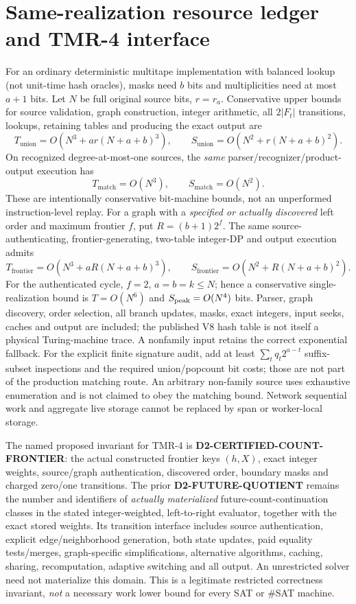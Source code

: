 \documentclass[11pt]{article}
\begin{document}
\section{Same-realization resource ledger and TMR-4 interface}
For an ordinary deterministic multitape implementation with balanced lookup (not unit-time hash oracles), masks need $b$ bits and multiplicities need at most $a+1$ bits. Let $N$ be full original source bits, $r=r_a$. Conservative upper bounds for source validation, graph construction, integer arithmetic, all $2|F_t|$ transitions, lookups, retaining tables and producing the exact output are
\[
T_{\mathrm{union}}=O(N^3+a r(N+a+b)^3),\qquad
S_{\mathrm{union}}=O(N^2+r(N+a+b)^2).
\]
On recognized degree-at-most-one sources, the \emph{same} parser/recognizer/product-output execution has
\[
T_{\mathrm{match}}=O(N^3),\qquad S_{\mathrm{match}}=O(N^2).
\]
These are intentionally conservative bit-machine bounds, not an unperformed instruction-level replay. For a graph with a \emph{specified or actually discovered} left order and maximum frontier $f$, put $R=(b+1)2^f$. The same source-authenticating, frontier-generating, two-table integer-DP and output execution admits
\[
T_{\mathrm{frontier}}=O(N^3+aR(N+a+b)^3),\qquad
S_{\mathrm{frontier}}=O(N^2+R(N+a+b)^2).
\]
For the authenticated cycle, $f=2$, $a=b=k\le N$; hence a conservative single-realization bound is $T=O(N^6)$ and $S_{\rm peak}=O(N^4)$ bits. Parser, graph discovery, order selection, all branch updates, masks, exact integers, input seeks, caches and output are included; the published V8 hash table is not itself a physical Turing-machine trace. A nonfamily input retains the correct exponential fallback. For the explicit finite signature audit, add at least $\sum_t q_t2^{a-t}$ suffix-subset inspections and the required union/popcount bit costs; those are not part of the production matching route. An arbitrary non-family source uses exhaustive enumeration and is not claimed to obey the matching bound. Network sequential work and aggregate live storage cannot be replaced by span or worker-local storage.

The named proposed invariant for TMR-4 is \textbf{D2-CERTIFIED-COUNT-FRONTIER}: the actual constructed frontier keys $(h,X)$, exact integer weights, source/graph authentication, discovered order, boundary masks and charged zero/one transitions. The prior \textbf{D2-FUTURE-QUOTIENT} remains the number and identifiers of \emph{actually materialized} future-count-continuation classes in the stated integer-weighted, left-to-right evaluator, together with the exact stored weights. Its transition interface includes source authentication, explicit edge/neighborhood generation, both state updates, paid equality tests/merges, graph-specific simplifications, alternative algorithms, caching, sharing, recomputation, adaptive switching and all output. An unrestricted solver need not materialize this domain. This is a legitimate restricted correctness invariant, \emph{not} a necessary work lower bound for every SAT or \#SAT machine.
\end{document}
